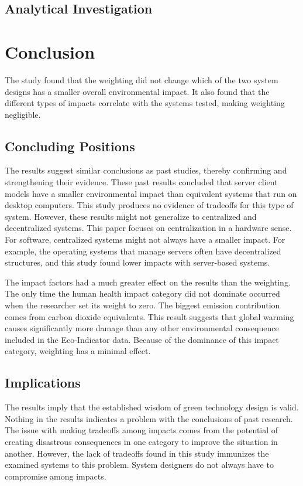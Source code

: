 \documentclass[final,journal,10pt,letterpaper,oneside,twocolumn,compsoc]%
{IEEEtran}
\begin{document}
\subsection{Analytical Investigation}

\section{Conclusion}
The study found that the weighting did not change which
of the two system designs has a smaller overall environmental impact. It also
found
that the different types of impacts correlate with the systems tested, making
weighting negligible.

\subsection{Concluding Positions}
The results suggest similar conclusions as past studies, thereby confirming and
strengthening their evidence. These past results
concluded that server client
models have a smaller environmental impact than equivalent systems that run on
desktop computers. This study produces no evidence of tradeoffs for this type
of system. However, these results might not generalize to centralized and
decentralized systems. This paper focuses on centralization
in a hardware sense. For software, centralized systems might not
always have a smaller impact. For example, the operating systems that manage
servers often have decentralized structures, and this study found lower impacts
with server-based systems.

The impact factors had a much greater effect on the results than the weighting.
The only time the human health impact category did not dominate occurred when
the researcher set its weight to zero. The biggest emission contribution comes
from carbon dioxide equivalents. This result suggests that global warming
causes significantly more damage than any other environmental consequence
included in the Eco-Indicator data. Because of the dominance of this impact
category, weighting has a minimal effect.

\subsection{Implications}
The results imply that the established wisdom of green technology design is
valid. Nothing in the results indicates a problem with the conclusions of
past research. The issue with making tradeoffs among impacts comes from the
potential of creating disastrous consequences in one category to improve the
situation in another. However, the lack of tradeoffs found in this study
immunizes the examined systems to this problem. System designers do not
always have to compromise among impacts.
\end{document}

